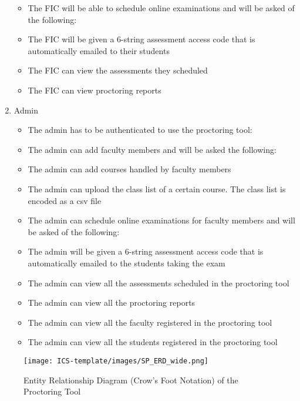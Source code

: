 \documentclass{icsthesis}
\begin{document}
\begin{mainmatter}
\begin{enumerate}
\begin{itemize}
            \item The FIC will be able to schedule online examinations and will be asked of the following:
            \item The FIC will be given a 6-string assessment access code that is automatically emailed to their students   
            \item The FIC can view the assessments they scheduled
            \item The FIC can view proctoring reports
        \end{itemize}
         \item Admin
     \begin{itemize}
            \item The admin has to be authenticated to use the proctoring tool: 
            \item The admin can add faculty members and will be asked the following: 
             \item The admin can add courses handled by faculty members 
            \item The admin can upload the class list of a certain course. The class list is encoded as a csv file         
            \item The admin can schedule online examinations for faculty members and will be asked of the following:
            \item The admin will be given a 6-string assessment access code that is automatically emailed to the students taking the exam
            \item The admin can view all the assessments scheduled in the proctoring tool
            \item The admin can view all the proctoring reports
            \item The admin can view all the faculty registered in the proctoring tool
            \item The admin can view all the students registered in the proctoring tool
        \end{itemize}
\end{enumerate}
\vspace*{5cm}
\begin{figure}[h]
    \centering
    \texttt{[image: ICS-template/images/SP\_ERD\_wide.png]}
    \caption{Entity Relationship Diagram (Crow's Foot Notation) of the Proctoring Tool}
    \label{fig: Entity Relationship Diagram (Crow's Foot Notation) of the Proctoring Tool}
\end{figure}
\\

\end{mainmatter}
\end{document}
